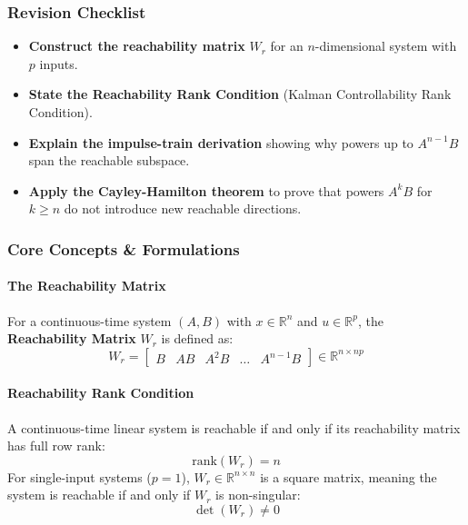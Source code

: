 \documentclass[12pt,onecolumn,twoside ]{article}
\begin{document}
	\subsubsection{Revision Checklist}
	\begin{itemize}
		\item[$\square$]
		\textbf{Construct the reachability matrix} $W_r$ for an $n$-dimensional system with $p$ inputs.
		\item[$\square$]
		\textbf{State the Reachability Rank Condition} (Kalman Controllability Rank Condition).
		\item[$\square$]
		\textbf{Explain the impulse-train derivation} showing why powers up to $A^{n-1}B$ span the reachable subspace.
		\item[$\square$]
		\textbf{Apply the Cayley-Hamilton theorem} to prove that powers $A^k B$ for $k \ge n$ do not introduce new reachable directions.
	\end{itemize}
	
	\subsubsection{Core Concepts \& Formulations}
	\paragraph{The Reachability Matrix}
	For a continuous-time system $(A, B)$ with $x \in \mathbb{R}^n$ and $u \in \mathbb{R}^p$, the \textbf{Reachability Matrix} $W_r$ is defined as: \[
	W_r = \begin{bmatrix} B & AB & A^2B & \dots & A^{n-1}B \end{bmatrix} \in \mathbb{R}^{n \times np}
	\]
	\paragraph{Reachability Rank Condition}
	A continuous-time linear system is reachable if and only if its reachability matrix has full row rank: \[
	\text{rank}(W_r) = n
	\] For single-input systems ($p = 1$), $W_r \in \mathbb{R}^{n \times n}$ is a square matrix, meaning the system is reachable if and only if $W_r$ is non-singular: \[
	\det(W_r) \neq 0
	\]
\end{document}

